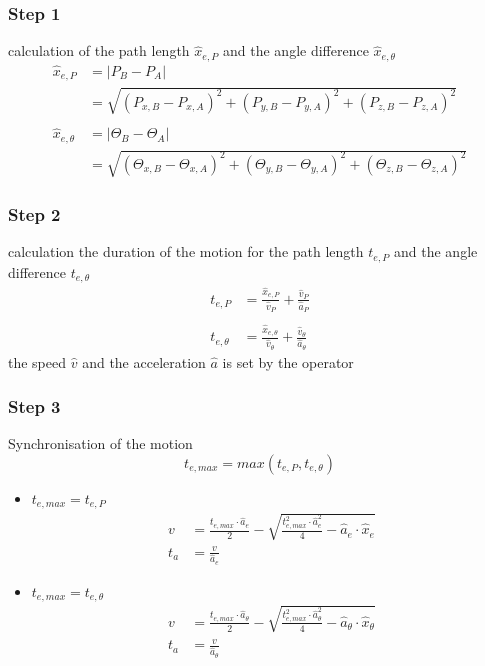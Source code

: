 \documentclass[%
  professionalfonts,%
  xcolor={%
    usenames,%
    dvipsnames,%
    svgnames,%
    table,%
    hyperref%
  }%
]{beamer}
\begin{document}
\subsubsection{Step 1}
\begin{frame}
calculation of the path length $\hat{x}_{e,P}$ and the angle difference $\hat{x}_{e,\theta}$
\begin{align*}
\hat{x}_{e,P} & = \left|P_{B} - P_{A}\right|\\
& = \sqrt{(P_{x,B} - P_{x,A})^2 + (P_{y,B} - P_{y,A})^2 + (P_{z,B} - P_{z,A})^2 }\\
\\
\hat{x}_{e,\theta} & = \left|\Theta_{B} - \Theta_{A}\right|\\
& = \sqrt{(\Theta_{x,B} - \Theta_{x,A})^2 + (\Theta_{y,B} - \Theta_{y,A})^2 + (\Theta_{z,B} - \Theta_{z,A})^2 }
\end{align*}
\end{frame}

\subsubsection{Step 2}
\begin{frame}
calculation the duration of the motion for the path length $t_{e,P}$ and the angle difference $t_{e,\theta}$
\begin{align*}
t_{e,P} & = \frac{\hat{x}_{e,P}}{\hat{v}_{P}}+\frac{\hat{v}_{P}}{\hat{a}_{P}} \\
\\
t_{e,\theta} & = \frac{\hat{x}_{e,\theta}}{\hat{v}_{\theta}}+\frac{\hat{v}_{\theta}}{\hat{a}_{\theta}}
\end{align*}
the speed $\hat{v}$ and the acceleration $\hat{a}$ is set by the operator
\end{frame}

\subsubsection{Step 3}
\begin{frame}
Synchronisation of the motion
\begin{equation*}
t_{e, max} = max\left(t_{e,P}, t_{e,\theta}\right)
\end{equation*}
\begin{itemize}
\item $t_{e, max} = t_{e,P}$
\begin{align*}
v & = \frac{t_{e,max} \cdot \hat{a}_{e}}{2}-\sqrt{\frac{t_{e,max}^2 \cdot \hat{a}_{e}^2}{4}-\hat{a}_{e}\cdot \hat{x}_{e}} \\
t_{a} & = \frac{v}{\hat{a}_{e}}
\end{align*}
\item $t_{e, max} = t_{e,\theta}$
\begin{align*}
v & = \frac{t_{e,max} \cdot \hat{a}_{\theta}}{2}-\sqrt{\frac{t_{e,max}^2 \cdot \hat{a}_{\theta}^2}{4}-\hat{a}_{\theta}\cdot \hat{x}_{\theta}} \\
t_{a} & = \frac{v }{\hat{a}_{\theta}}
\end{align*}
\end{itemize}
\end{frame}
\end{document}
